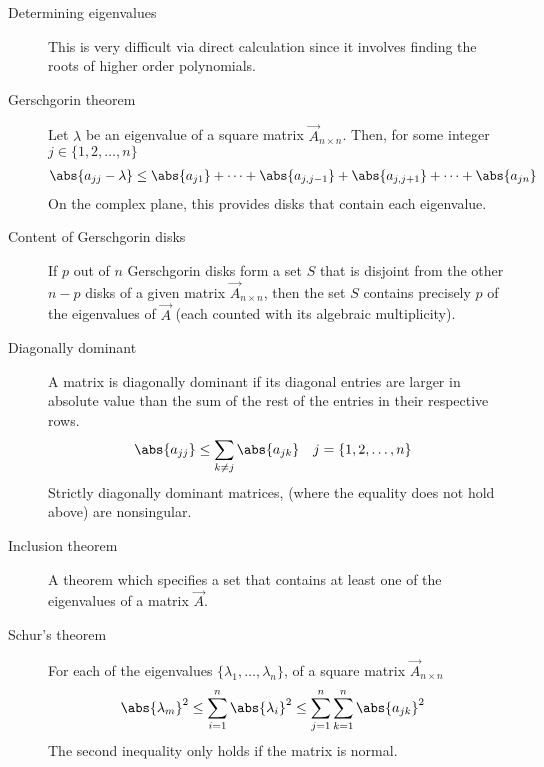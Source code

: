 \begin{description}
    \item[Determining eigenvalues] This is very difficult via direct calculation since
        it involves finding the roots of higher order polynomials. \par

    \item[Gerschgorin theorem] Let $ \lambda $ be an eigenvalue of a square matrix
        $ \vec{A}_{n \times n} $. Then, for some integer $ j \in \{1,2,\dots,n\} $
        \begin{align}
            \abs{a_{jj} - \lambda} & \leq \abs{a_{j1}} + \dots + \abs{a_{j,j-1}}
            + \abs{a_{j,j+1}} + \dots + \abs{a_{jn}}
        \end{align}
        On the complex plane, this provides disks that contain each eigenvalue.

    \item[Content of Gerschgorin disks] If $ p $ out of $ n $ Gerschgorin disks form
        a set $ S $ that is disjoint from the other $ n-p $ disks of a given matrix
        $ \vec{A}_{n \times n} $, then the set $ S $ contains precisely $ p $ of
        the eigenvalues of $ \vec{A} $ (each counted with its algebraic multiplicity).

    \item[Diagonally dominant] A matrix is diagonally dominant if its diagonal entries
        are larger in absolute value than the sum of the rest of the entries in their
        respective rows.
        \begin{align}
            \abs{a_{jj}} & \leq \sum_{k\neq j} \abs{a_{jk}} &
            j            & = \{1,2,\dots,n\}
        \end{align}
        Strictly diagonally dominant matrices, (where the equality does not hold above)
        are nonsingular.

    \item[Inclusion theorem] A theorem which specifies a set that contains at least
        one of the eigenvalues of a matrix $ \vec{A} $.

    \item[Schur's theorem] For each of the eigenvalues
        $ \{\lambda_1, \dots, \lambda_n\} $, of a square matrix $ \vec{A}_{n \times n} $
        \begin{align}
            \abs{\lambda_m}^2 & \leq \sum_{i=1}^{n} \abs{\lambda_i}^2
            \leq \sum_{j=1}^{n} \sum_{k=1}^{n} \abs{a_{jk}}^2
        \end{align}
        The second inequality only holds if the matrix is normal.


\end{description}
